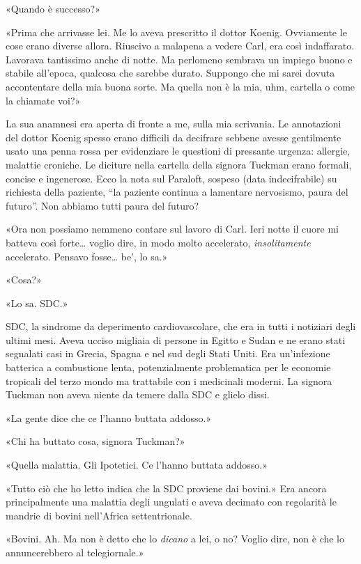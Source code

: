 «Quando è successo?»

«Prima che arrivasse lei. Me lo aveva prescritto il dottor Koenig.
Ovviamente le cose erano diverse allora. Riuscivo a malapena a vedere
Carl, era così indaffarato. Lavorava tantissimo anche di notte. Ma
perlomeno sembrava un impiego buono e stabile all'epoca, qualcosa che
sarebbe durato. Suppongo che mi sarei dovuta accontentare della mia
buona sorte. Ma quella non è la mia, uhm, cartella o come la chiamate
voi?»

La sua anamnesi era aperta di fronte a me, sulla mia scrivania. Le
annotazioni del dottor Koenig spesso erano difficili da decifrare
sebbene avesse gentilmente usato una penna rossa per evidenziare le
questioni di pressante urgenza: allergie, malattie croniche. Le diciture
nella cartella della signora Tuckman erano formali, concise e
ingenerose. Ecco la nota sul Paraloft, sospeso (data indecifrabile) su
richiesta della paziente, ``la paziente continua a lamentare nervosismo,
paura del futuro''. Non abbiamo tutti paura del futuro?

«Ora non possiamo nemmeno contare sul lavoro di Carl. Ieri notte il
cuore mi batteva così forte\ldots{} voglio dire, in modo molto
accelerato, \emph{insolitamente} accelerato. Pensavo fosse\ldots{} be',
lo sa.»

«Cosa?»

«Lo sa. SDC.»

SDC, la sindrome da deperimento cardiovascolare, che era in tutti i
notiziari degli ultimi mesi. Aveva ucciso migliaia di persone in Egitto
e Sudan e ne erano stati segnalati casi in Grecia, Spagna e nel sud
degli Stati Uniti. Era un'infezione batterica a combustione lenta,
potenzialmente problematica per le economie tropicali del terzo mondo ma
trattabile con i medicinali moderni. La signora Tuckman non aveva niente
da temere dalla SDC e glielo dissi.

«La gente dice che ce l'hanno buttata addosso.»

«Chi ha buttato cosa, signora Tuckman?»

«Quella malattia. Gli Ipotetici. Ce l'hanno buttata addosso.»

«Tutto ciò che ho letto indica che la SDC proviene dai bovini.» Era
ancora principalmente una malattia degli ungulati e aveva decimato con
regolarità le mandrie di bovini nell'Africa settentrionale.

«Bovini. Ah. Ma non è detto che lo \emph{dicano} a lei, o no? Voglio
dire, non è che lo annuncerebbero al telegiornale.»

